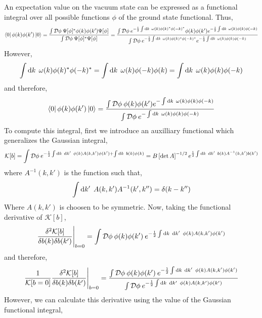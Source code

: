 \documentclass[12pt]{extarticle}
\begin{document}
An expectation value on the vacuum state can be expressed as a functional integral over all possible functions $\phi$ of the ground state functional. Thus,
\begin{align*}
\left< 0 \right| \phi(k) \phi(k') \left| 0 \right> = \frac{\int \mathcal{D} \phi \: \Psi[\phi]^{*} \phi(k) \phi(k') \Psi[\phi]}{\int \mathcal{D} \phi \: \Psi[\phi]^{*} \Psi[\phi]} = \frac{\int \mathcal{D} \phi \: e^{-\frac{1}{2} \int \mathrm{d}k \: \: \omega(k) \phi(k)^{*} \phi(-k)^{*}} \phi(k) \phi(k') e^{-\frac{1}{2} \int \mathrm{d}k \: \: \omega(k) \phi(k) \phi(-k)}}{\int \mathcal{D} \phi \: e^{-\frac{1}{2} \int \mathrm{d}k \: \: \omega(k) \phi(k)^{*} \phi(-k)^{*}} e^{-\frac{1}{2} \int \mathrm{d}k \: \: \omega(k) \phi(k) \phi(-k)}}
\end{align*}
However, 
\[ \int \mathrm{d}k \: \: \omega(k) \phi(k)^{*} \phi(-k)^{*} = \int \mathrm{d}k \: \: \omega(k) \phi(-k) \phi(k) = \int \mathrm{d}k \: \: \omega(k) \phi(k) \phi(-k) \]
and therefore,
\begin{align*}
\left< 0 \right| \phi(k) \phi(k') \left| 0 \right> = \frac{\int \mathcal{D} \phi \: \phi(k) \phi(k') e^{- \int \mathrm{d}k \: \: \omega(k) \phi(k) \phi(-k)}}{\int \mathcal{D} \phi \: e^{- \int \mathrm{d}k \: \: \omega(k) \phi(k) \phi(-k)}}
\end{align*}
To compute this integral, first we introduce an auxilliary functional which generalizes the Gaussian integral, 
\[ \mathcal{K}[b] = \int \mathcal{D} \phi \: e^{- \frac{1}{2} \int \mathrm{d}k \: \: \mathrm{d}k' \: \: \phi(k) A(k,k') \phi(k') + \int \mathrm{d}k \: \: b(k) \phi(k)} = B \left[ \det{A} \right]^{-1/2} e^{\frac{1}{2} \int \mathrm{d}k \: \: \mathrm{d}k' \: \: b(k) A^{-1}(k, k') b(k')} \] 
where $A^{-1}(k, k')$ is the function such that,
\[ \int \mathrm{d}k' \: \: A(k, k') A^{-1}(k', k'') = \delta(k - k'')\]
Where $A(k, k')$ is choosen to be symmetric. Now, taking the functional derivative of $\mathcal{K}[b]$,
\begin{align*}
\frac{\delta^2 \mathcal{K}[b]}{\delta b(k) \delta b(k')} \Bigg|_{b = 0} = \int \mathcal{D} \phi \: \phi(k) \phi(k') \: e^{- \frac{1}{2} \int \mathrm{d}k \: \: \mathrm{d}k' \: \: \phi(k) A(k,k') \phi(k')}
\end{align*}
and therefore,
\begin{align*}
\frac{1}{\mathcal{K}[b = 0]} \frac{\delta^2 \mathcal{K}[b]}{\delta b(k) \delta b(k')} \Bigg|_{b = 0} = \frac{\int \mathcal{D} \phi \: \phi(k) \phi(k') \: e^{- \frac{1}{2} \int \mathrm{d}k \: \: \mathrm{d}k' \: \: \phi(k) A(k,k') \phi(k')}}{\int \mathcal{D} \phi \: e^{- \frac{1}{2} \int \mathrm{d}k \: \: \mathrm{d}k' \: \: \phi(k) A(k,k') \phi(k')}}
\end{align*}
However, we can calculate this derivative using the value of the Gaussian functional integral, 
\end{document}

